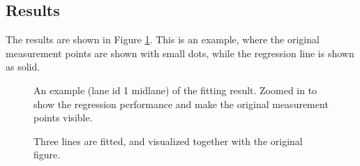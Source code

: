 \documentclass[sn-mathphys-num]{sn-jnl}%
\begin{document}
\subsection{Results}
The results are shown in Figure \ref{fig:fittedLines_zoomed}. This is an example, where the original measurement points are shown with small dots, while the regression line is shown as solid.
\begin{figure}[h]
    \caption{An example (lane id 1 midlane) of the fitting result. Zoomed in to show the regression performance and make the original measurement points visible.}
    \label{fig:fittedLines_zoomed}
\end{figure}

\begin{figure}[h]
    \caption{Three lines are fitted, and visualized together with the original figure.}
    \label{fig:fittedLines}
\end{figure}
\end{document}
